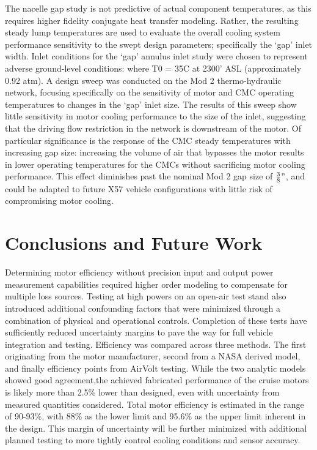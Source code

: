\documentclass[]{aiaa-tc}%
\begin{document}
The nacelle gap study is not predictive of actual component temperatures,
as this requires higher fidelity conjugate heat transfer modeling. 
Rather, the resulting steady lump temperatures are used to evaluate the overall cooling system performance sensitivity to the swept design parameters; specifically the `gap' inlet width.  Inlet conditions for the `gap' annulus inlet study were chosen to represent adverse ground-level conditions:
where T0 = 35\degree C at 2300' ASL (approximately 0.92 atm).  
A design sweep was conducted on the Mod 2 thermo-hydraulic network, focusing specifically on the sensitivity of motor and CMC operating temperatures to changes in the `gap' inlet size.  
The results of this sweep show little sensitivity in motor cooling performance to the size of the inlet, suggesting that the driving flow restriction in the network is downstream of the motor.  Of particular significance is the response of the CMC steady temperatures with increasing gap size:  increasing the volume of air that bypasses the motor results in lower operating temperatures for the CMCs without sacrificing motor cooling performance.  This effect diminishes past the nominal Mod 2 gap size of $\frac{3}{8}"$, and could be adapted to future X57 vehicle configurations with little risk of compromising motor cooling.


\section{Conclusions and Future Work}

Determining motor efficiency without precision input and output power measurement capabilities required higher order modeling to compensate for multiple loss sources. 
Testing at high powers on an open-air test stand also introduced additional confounding factors that were minimized through a combination of physical and operational controls.
Completion of these tests have sufficiently reduced uncertainty margins to pave the way for full vehicle integration and testing. Efficiency was compared across three methods. The first originating from the motor manufacturer, second from a NASA derived model, and finally efficiency points from AirVolt testing. While the two analytic models showed good agreement,the achieved fabricated performance of the cruise motors is likely more than 2.5\% lower than designed, even with uncertainty from measured quantities considered. Total motor efficiency is estimated in the range of 90-93\%, with 88\% as the lower limit and 95.6\% as the upper limit inherent in the design. This margin of uncertainty will be further minimized with additional planned testing to more tightly control cooling conditions and sensor accuracy.
\end{document}
